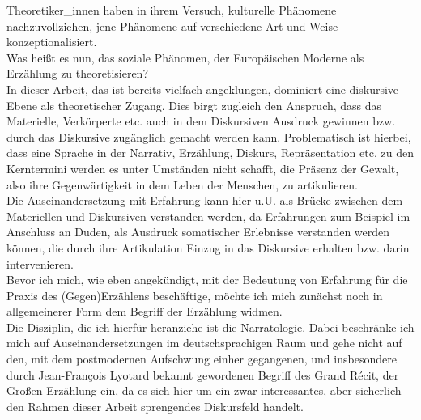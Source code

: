 \noindent Theoretiker\_innen haben in ihrem Versuch, kulturelle Phänomene
nachzuvollziehen, jene Phänomene auf verschiedene Art und Weise
konzeptionalisiert.\\
 Was heißt es nun, das soziale Phänomen, der Europäischen
Moderne als Erzählung zu theoretisieren?\\
In dieser Arbeit, das ist bereits vielfach angeklungen, dominiert eine
diskursive Ebene als theoretischer Zugang. Dies birgt zugleich den Anspruch,
dass das Materielle, Verkörperte etc. auch in dem Diskursiven Ausdruck gewinnen
bzw. durch das Diskursive zugänglich gemacht werden kann. Problematisch ist
hierbei, dass eine Sprache in der Narrativ, Erzählung, Diskurs, Repräsentation
etc. zu den Kerntermini werden es unter Umständen nicht schafft, die Präsenz
der Gewalt, also ihre Gegenwärtigkeit in dem Leben der Menschen, zu
artikulieren.\\
\noindent Die Auseinandersetzung mit Erfahrung kann hier u.U. als Brücke zwischen dem
Materiellen und Diskursiven verstanden werden, da Erfahrungen zum Beispiel im
Anschluss an Duden\footnotemark {}, als Ausdruck somatischer Erlebnisse verstanden werden
können, die durch ihre Artikulation Einzug in das Diskursive erhalten bzw.
darin intervenieren.\\

\noindent Bevor ich mich, wie eben angekündigt, mit der Bedeutung von Erfahrung für die
Praxis des (Gegen)Erzählens beschäftige, möchte ich mich zunächst noch in
allgemeinerer Form dem Begriff der Erzählung widmen.\\
Die Disziplin, die ich hierfür heranziehe ist die Narratologie. Dabei
beschränke ich mich auf Auseinandersetzungen im deutschsprachigen Raum und gehe
nicht auf den, mit dem postmodernen Aufschwung einher gegangenen, und
insbesondere durch Jean-François Lyotard bekannt gewordenen Begriff des Grand
Récit, der Großen Erzählung ein, da es sich hier um ein zwar interessantes,
aber sicherlich den Rahmen dieser Arbeit sprengendes Diskursfeld handelt.\\

